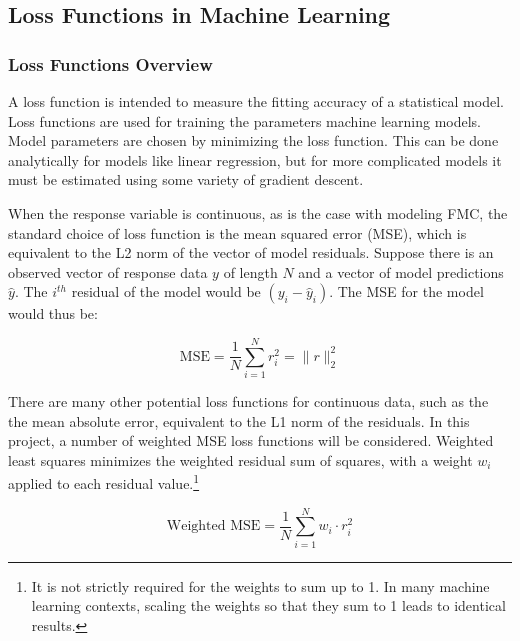 \documentclass[11pt]{article}%
\begin{document}
\subsection{Loss Functions in Machine Learning}

\subsubsection{Loss Functions Overview}

A loss function is intended to measure the fitting accuracy of a statistical model. Loss functions are used for training the parameters machine learning models. Model parameters are chosen by minimizing the loss function. This can be done analytically for models like linear regression, but for more complicated models it must be estimated using some variety of gradient descent. 

When the response variable is continuous, as is the case with modeling FMC, the standard choice of loss function is the mean squared error (MSE), which is equivalent to the L2 norm of the vector of model residuals. Suppose there is an observed vector of response data $y$ of length $N$ and a vector of model predictions $\hat y$. The $i^{th}$ residual of the model would be $(y_i - \hat y_i)$. The MSE for the model would thus be:


\begin{equation}
    \label{eq:mse}
    \text{MSE} = \frac{1}{N}\sum_{i=1}^N r_i^2 = \|r\|_2^2
\end{equation}

There are many other potential loss functions for continuous data, such as the the mean absolute error, equivalent to the L1 norm of the residuals. In this project, a number of weighted MSE loss functions will be considered. Weighted least squares minimizes the weighted residual sum of squares, with a weight $w_i$ applied to each residual value.\footnote{It is not strictly required for the weights to sum up to 1. In many machine learning contexts, scaling the weights so that they sum to 1 leads to identical results.}


\begin{equation}
    \label{eq:wmse}
    \text{Weighted MSE} = \frac{1}{N}\sum_{i=1}^N w_i\cdot r_i^2
\end{equation}
\end{document}
